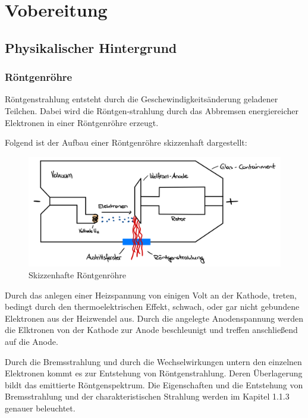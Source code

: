 \documentclass{article}
\begin{document}
\newpage

\section{Vobereitung}

\subsection{Physikalischer Hintergrund}

    \subsubsection{Röntgenröhre}
    
    \cite{medizinphysik}
    
    Röntgenstrahlung entsteht durch die Geschewindigkeitsänderung geladener Teilchen. Dabei wird die Röntgen-strahlung durch das Abbremsen energiereicher Elektronen in einer Röntgenröhre erzeugt.
    
    Folgend ist der Aufbau einer Röntgenröhre skizzenhaft dargestellt:

    \begin{figure}[H]
        \centering
        \includegraphics[width=0.7\linewidth]{Abbildungen/Röntgenröhre.pdf}
        \caption{Skizzenhafte Röntgenröhre}
    \end{figure}

    Durch das anlegen einer Heizspannung von einigen Volt an der Kathode, treten, bedingt durch den thermoelektrischen Effekt, schwach, oder gar nicht gebundene Elektronen aus der Heizwendel aus. Durch die angelegte Anodenspannung werden die Elktronen von der Kathode zur Anode beschleunigt und treffen anschließend auf die Anode.

    Durch die Bremsstrahlung und durch die Wechselwirkungen untern den einzelnen Elektronen kommt es zur Entstehung von Röntgenstrahlung. Deren Überlagerung bildt das emittierte Röntgenspektrum. Die Eigenschaften und die Entstehung von Bremsstrahlung und der charakteristischen Strahlung werden im Kapitel 1.1.3 genauer beleuchtet. 
\end{document}
